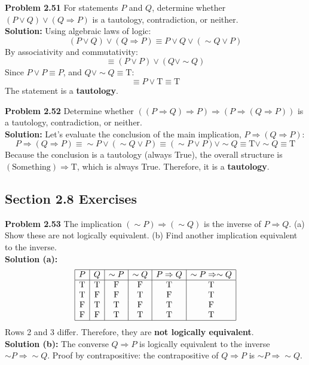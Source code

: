 \documentclass{article}
\begin{document}
\vspace{1em}
\textbf{Problem 2.51} For statements $P$ and $Q$, determine whether $(P \lor Q) \lor (Q \Rightarrow P)$ is a tautology, contradiction, or neither.
\\[0.5em]
\textbf{Solution:} Using algebraic laws of logic:
\[ (P \lor Q) \lor (Q \Rightarrow P) \equiv P \lor Q \lor (\sim Q \lor P) \]
By associativity and commutativity:
\[ \equiv (P \lor P) \lor (Q \lor \sim Q) \]
Since $P \lor P \equiv P$, and $Q \lor \sim Q \equiv \text{T}$:
\[ \equiv P \lor \text{T} \equiv \text{T} \]
The statement is a \textbf{tautology}.

\vspace{1em}
\textbf{Problem 2.52} Determine whether $((P \Rightarrow Q) \Rightarrow P) \Rightarrow (P \Rightarrow (Q \Rightarrow P))$ is a tautology, contradiction, or neither.
\\[0.5em]
\textbf{Solution:} Let's evaluate the conclusion of the main implication, $P \Rightarrow (Q \Rightarrow P)$:
\[ P \Rightarrow (Q \Rightarrow P) \equiv \sim P \lor (\sim Q \lor P) \equiv (\sim P \lor P) \lor \sim Q \equiv \text{T} \lor \sim Q \equiv \text{T} \]
Because the conclusion is a tautology (always True), the overall structure is $(\text{Something}) \Rightarrow \text{T}$, which is always True. Therefore, it is a \textbf{tautology}.

\subsection*{Section 2.8 Exercises}

\textbf{Problem 2.53} The implication $(\sim P) \Rightarrow (\sim Q)$ is the inverse of $P \Rightarrow Q$. (a) Show these are not logically equivalent. (b) Find another implication equivalent to the inverse.
\\[0.5em]
\textbf{Solution (a):}
\[
\begin{array}{|c|c|c|c|c|c|}
\hline
P & Q & \sim P & \sim Q & P \Rightarrow Q & \sim P \Rightarrow \sim Q \\
\hline
\text{T} & \text{T} & \text{F} & \text{F} & \text{T} & \text{T} \\
\text{T} & \text{F} & \text{F} & \text{T} & \text{F} & \text{T} \\
\text{F} & \text{T} & \text{T} & \text{F} & \text{T} & \text{F} \\
\text{F} & \text{F} & \text{T} & \text{T} & \text{T} & \text{T} \\
\hline
\end{array}
\]
Rows 2 and 3 differ. Therefore, they are \textbf{not logically equivalent}.
\\
\textbf{Solution (b):} The converse $Q \Rightarrow P$ is logically equivalent to the inverse $\sim P \Rightarrow \sim Q$. 
Proof by contrapositive: the contrapositive of $Q \Rightarrow P$ is $\sim P \Rightarrow \sim Q$.
\end{document}
